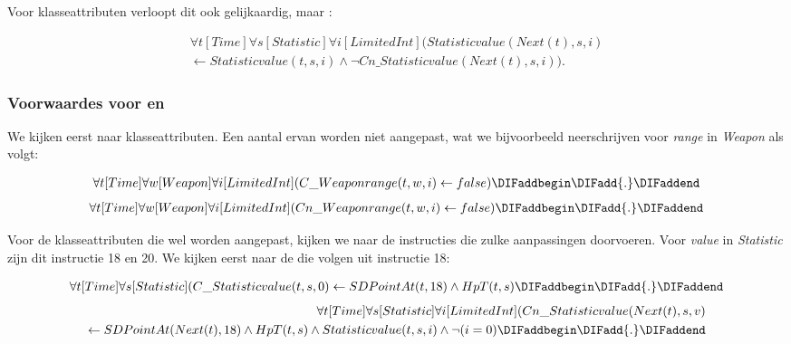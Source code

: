 \parbreak

Voor klasseattributen verloopt dit ook gelijkaardig, maar \DIFdelbegin {}\textit{}%
\textit{} %
\textit{}%
\DIFdelend \DIFaddbegin {}\DIFaddend :

\begin{align*}
	\forall{t}[Time]\forall{s}[Statistic]\forall{i}[LimitedInt](Statisticvalue(Next(t), s, i) \\ \leftarrow Statisticvalue(t, s, i) \land \lnot Cn\_Statisticvalue(Next(t), s, i)).
\end{align*}

\subsubsection{Voorwaardes voor \DIFdelbegin \textit{} %
\DIFdelend \DIFaddbegin {}\DIFaddend en \DIFdelbegin \textit{}%
\DIFdelend \DIFaddbegin {}\DIFaddend }
We kijken eerst naar klasseattributen. Een aantal ervan worden niet aangepast, wat we bijvoorbeeld neerschrijven voor \textit{range} in \textit{Weapon} als volgt:

\begin{align*}
	\forall{t}[Time]\forall{w}[Weapon]\forall{i}[LimitedInt](C\_Weaponrange(t, w, i) \leftarrow false)\DIFaddbegin \DIFadd{.
}\DIFaddend \end{align*}
\begin{align*}
	\forall{t}[Time]\forall{w}[Weapon]\forall{i}[LimitedInt](Cn\_Weaponrange(t, w, i) \leftarrow false)\DIFaddbegin \DIFadd{.
}\DIFaddend \end{align*}

Voor de klasseattributen die wel worden aangepast, kijken we naar de instructies die zulke aanpassingen doorvoeren. Voor \textit{value} in \textit{Statistic} zijn dit instructie 18 en 20. We kijken eerst naar de \DIFdelbegin \textit{}%
\textit{}%
\DIFdelend \DIFaddbegin {}\DIFaddend die volgen uit instructie 18:

\begin{align*}
	\forall{t}[Time]\forall{s}[Statistic](C\_Statisticvalue(t, s, 0) \leftarrow SDPointAt(t, 18) \land HpT(t, s)\DIFaddbegin \DIFadd{.
}\DIFaddend \end{align*}
\begin{align*}
	\forall{t}[Time]\forall{s}[Statistic]\forall{i}[LimitedInt](Cn\_Statisticvalue(Next(t), s, v) \\ \leftarrow SDPointAt(Next(t), 18) \land HpT(t, s) \land Statisticvalue(t, s, i) \land \lnot{}(i = 0)\DIFaddbegin \DIFadd{.
}\DIFaddend \end{align*}

